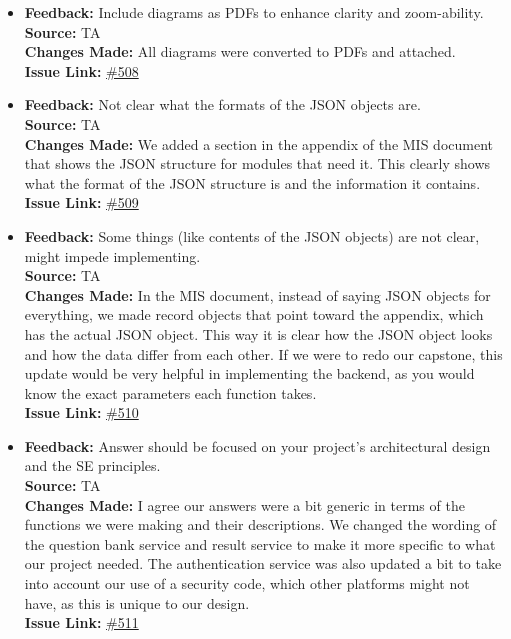 \documentclass{article}
\begin{document}
\begin{itemize}
    \item
      \textbf{Feedback:} Include diagrams as PDFs to enhance clarity and zoom-ability. \\
      \textbf{Source:} TA \\
      \textbf{Changes Made:} All diagrams were converted to PDFs and attached. \\
      \textbf{Issue Link:} \href{https://github.com/parishanizam/TeleHealth/issues/508}{\#508}
    
    \item
      \textbf{Feedback:} Not clear what the formats of the JSON objects are. \\
      \textbf{Source:} TA \\
      \textbf{Changes Made:} We added a section in the appendix of the MIS document that shows the JSON structure for modules that need it. This clearly shows what the format of the JSON structure is and the information it contains. \\
      \textbf{Issue Link:} \href{https://github.com/parishanizam/TeleHealth/issues/509}{\#509}
    
    \item
      \textbf{Feedback:} Some things (like contents of the JSON objects) are not clear, might impede implementing. \\
      \textbf{Source:} TA \\
      \textbf{Changes Made:} In the MIS document, instead of saying JSON objects for everything, we made record objects that point toward the appendix, which has the actual JSON object. This way it is clear how the JSON object looks and how the data differ from each other. If we were to redo our capstone, this update would be very helpful in implementing the backend, as you would know the exact parameters each function takes. \\
      \textbf{Issue Link:} \href{https://github.com/parishanizam/TeleHealth/issues/510}{\#510}
    
    \item
      \textbf{Feedback:} Answer should be focused on your project’s architectural design and the SE principles. \\
      \textbf{Source:} TA \\
      \textbf{Changes Made:} I agree our answers were a bit generic in terms of the functions we were making and their descriptions. We changed the wording of the question bank service and result service to make it more specific to what our project needed. The authentication service was also updated a bit to take into account our use of a security code, which other platforms might not have, as this is unique to our design. \\
      \textbf{Issue Link:} \href{https://github.com/parishanizam/TeleHealth/issues/511}{\#511}
    

\end{itemize}
\end{document}
